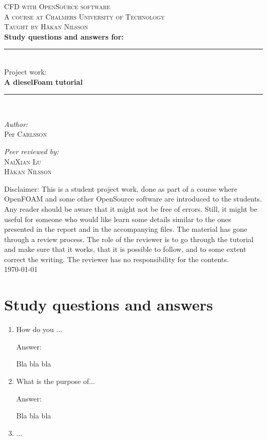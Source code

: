\documentclass{report}
\newcommand{\HRule}{\rule{\linewidth}{0.5mm}}
\begin{document}
 \begin{titlepage}
  \begin{center}
 
 
	
	\textsc{\LARGE CFD with OpenSource software}\\[0.5cm]	
	\textsc{A course at Chalmers University of Technology}\\
	\textsc{Taught by H{\aa}kan Nilsson}\\[0.5cm]	
	
        {\huge \bfseries Study questions and answers for:}
        \HRule \\[0.4cm]
        Project work:\\[0.2cm]
	{ \huge \bfseries A dieselFoam tutorial}\\[0.4cm]
	\HRule \\[1cm]

	\begin{minipage}{0.4\textwidth}
	\begin{flushleft} \large
	\emph{Author:}\\
	Per \textsc{Carlsson}
	\end{flushleft}
	\end{minipage}
	\begin{minipage}{0.4\textwidth}
	\begin{flushright} \large
	\emph{Peer reviewed by:} \\
	 \textsc{NaiXian Lu}\\
	\textsc{H\aa kan Nilsson}\\
	\end{flushright}
	\end{minipage}

	\vfill

        {Disclaimer: This is a student project work, done as part of a course where OpenFOAM and some other OpenSource software are introduced to the students. Any reader should be aware that it might not be free of errors. Still, it might be useful for someone who would like learn some details similar to the ones presented in the report and in the accompanying files. The material has gone through a review process. The role of the reviewer is to go through the tutorial and make sure that it works, that it is possible to follow, and to some extent correct the writing. The reviewer has no responsibility for the contents.}\\[2cm]

	{\large \today}
	 
	\end{center}

 \end{titlepage}

\chapter*{Study questions and answers}
\begin{enumerate}
\item How do you ...

Answer:

Bla bla bla
\item What is the purpose of...

Answer:

Bla bla bla
\item ...
\end{enumerate}
\end{document}
